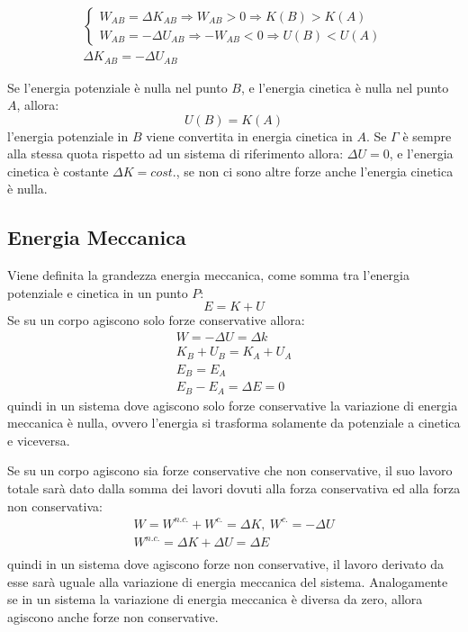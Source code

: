 \documentclass{article}
\numberwithin{equation}{subsection}
\begin{document}
\begin{gather}
    \begin{cases}
       W_{AB}=\Delta K_{AB}\Rightarrow W_{AB}>0\Rightarrow K(B)>K(A)\\
      W_{AB}=-\Delta U_{AB}\Rightarrow -W_{AB}<0\Rightarrow U(B)<U(A)
    \end{cases}\\
    \Delta K_{AB}=-\Delta U_{AB}
\end{gather}

Se l'energia potenziale è nulla nel punto $B$, e l'energia cinetica 
è nulla nel punto $A$, allora:
\begin{equation}
    U(B)=K(A)
\end{equation}
l'energia potenziale in $B$ viene convertita in energia cinetica in $A$.
Se $\Gamma$ è sempre alla stessa 
quota rispetto ad un sistema di riferimento allora: $\Delta U=0$, 
e l'energia cinetica è costante $\Delta K = cost.$, se non ci sono 
altre forze anche l'energia cinetica è nulla.

\subsection{Energia Meccanica}
Viene definita la grandezza energia meccanica, come somma tra 
l'energia potenziale e cinetica in un punto $P$:
\begin{equation}
    E=K+U
\end{equation}
Se su un corpo agiscono solo forze conservative allora:
\begin{gather}
    W=-\Delta U = \Delta k\\    
    K_B+U_B=K_A+U_A\\
    E_B=E_A\\
    E_B-E_A=\Delta E=0
\end{gather}
quindi in un sistema dove agiscono solo forze conservative la 
variazione di energia meccanica è nulla, ovvero l'energia si 
trasforma solamente da potenziale a cinetica e viceversa. 

Se su un corpo agiscono sia forze conservative che non 
conservative, il suo lavoro totale sarà dato dalla somma dei 
lavori dovuti alla forza conservativa ed alla forza non 
conservativa: 
\begin{gather}
    W=W^{n.c.}+W^{c.}=\Delta K,\:W^{c.}=-\Delta U\\
    W^{n.c.}=\Delta K +\Delta U=\Delta E\\
\end{gather}
quindi in un sistema dove agiscono forze non conservative, il 
lavoro derivato da esse sarà uguale alla variazione di energia 
meccanica del sistema. Analogamente se in un sistema la 
variazione di energia meccanica è diversa da zero, allora 
agiscono anche forze non conservative.
\end{document}
